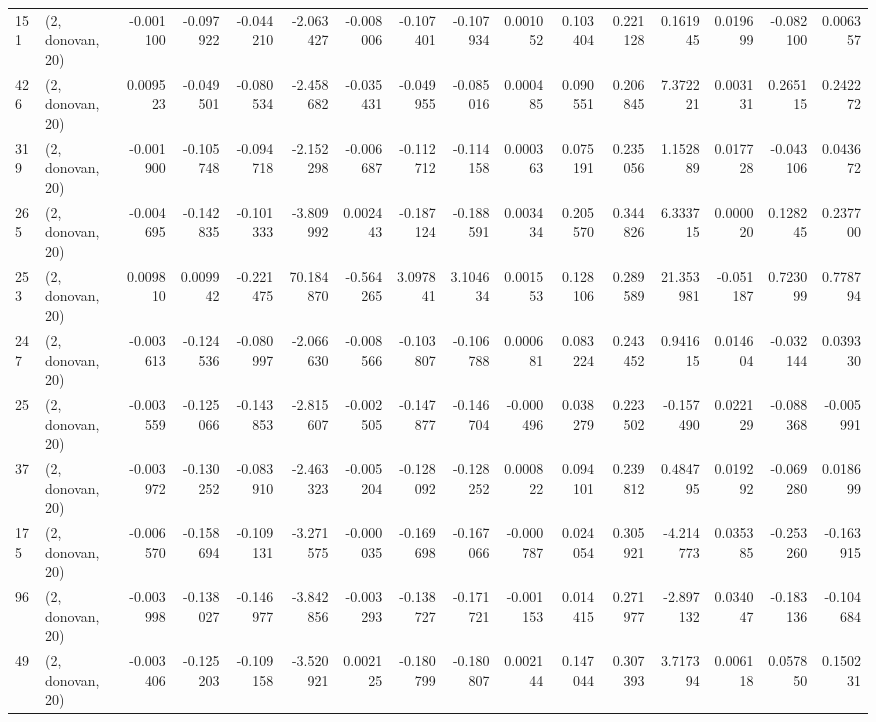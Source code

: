 \begin{tabular}{llrrrrrrrrrrrrrr}
151 &  (2, donovan, 20) &  -0.001100 & -0.097922 & -0.044210 &   -2.063427 & -0.008006 &  -0.107401 &  -0.107934 &  0.001052 &  0.103404 &  0.221128 &    0.161945 &  0.019699 &  -0.082100 &   0.006357 \\
426 &  (2, donovan, 20) &   0.009523 & -0.049501 & -0.080534 &   -2.458682 & -0.035431 &  -0.049955 &  -0.085016 &  0.000485 &  0.090551 &  0.206845 &    7.372221 &  0.003131 &   0.265115 &   0.242272 \\
319 &  (2, donovan, 20) &  -0.001900 & -0.105748 & -0.094718 &   -2.152298 & -0.006687 &  -0.112712 &  -0.114158 &  0.000363 &  0.075191 &  0.235056 &    1.152889 &  0.017728 &  -0.043106 &   0.043672 \\
265 &  (2, donovan, 20) &  -0.004695 & -0.142835 & -0.101333 &   -3.809992 &  0.002443 &  -0.187124 &  -0.188591 &  0.003434 &  0.205570 &  0.344826 &    6.333715 &  0.000020 &   0.128245 &   0.237700 \\
253 &  (2, donovan, 20) &   0.009810 &  0.009942 & -0.221475 &   70.184870 & -0.564265 &   3.097841 &   3.104634 &  0.001553 &  0.128106 &  0.289589 &   21.353981 & -0.051187 &   0.723099 &   0.778794 \\
247 &  (2, donovan, 20) &  -0.003613 & -0.124536 & -0.080997 &   -2.066630 & -0.008566 &  -0.103807 &  -0.106788 &  0.000681 &  0.083224 &  0.243452 &    0.941615 &  0.014604 &  -0.032144 &   0.039330 \\
25  &  (2, donovan, 20) &  -0.003559 & -0.125066 & -0.143853 &   -2.815607 & -0.002505 &  -0.147877 &  -0.146704 & -0.000496 &  0.038279 &  0.223502 &   -0.157490 &  0.022129 &  -0.088368 &  -0.005991 \\
37  &  (2, donovan, 20) &  -0.003972 & -0.130252 & -0.083910 &   -2.463323 & -0.005204 &  -0.128092 &  -0.128252 &  0.000822 &  0.094101 &  0.239812 &    0.484795 &  0.019292 &  -0.069280 &   0.018699 \\
175 &  (2, donovan, 20) &  -0.006570 & -0.158694 & -0.109131 &   -3.271575 & -0.000035 &  -0.169698 &  -0.167066 & -0.000787 &  0.024054 &  0.305921 &   -4.214773 &  0.035385 &  -0.253260 &  -0.163915 \\
96  &  (2, donovan, 20) &  -0.003998 & -0.138027 & -0.146977 &   -3.842856 & -0.003293 &  -0.138727 &  -0.171721 & -0.001153 &  0.014415 &  0.271977 &   -2.897132 &  0.034047 &  -0.183136 &  -0.104684 \\
49  &  (2, donovan, 20) &  -0.003406 & -0.125203 & -0.109158 &   -3.520921 &  0.002125 &  -0.180799 &  -0.180807 &  0.002144 &  0.147044 &  0.307393 &    3.717394 &  0.006118 &   0.057850 &   0.150231 \\

\end{tabular}
